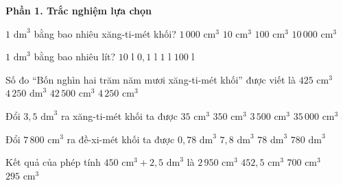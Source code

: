 \textbf{Phần 1. Trắc nghiệm lựa chọn}

\begin{ex} %
$1\text{ dm}^3$ bằng bao nhiêu xăng-ti-mét khối?
\choice
{\True $1\,000\text{ cm}^3$}
{$10\text{ cm}^3$}
{$100\text{ cm}^3$}
{$10\,000\text{ cm}^3$}
\end{ex}

\begin{ex} %
$1\text{ dm}^3$ bằng bao nhiêu lít?
\choice
{$10\text{ l}$}
{$0{,}1\text{ l}$}
{\True $1\text{ l}$}
{$100\text{ l}$}
\end{ex}

\begin{ex} %
Số đo “Bốn nghìn hai trăm năm mươi xăng-ti-mét khối” được viết là
\choice
{$425\text{ cm}^3$}
{$4\,250\text{ dm}^3$}
{$42\,500\text{ cm}^3$}
{\True $4\,250\text{ cm}^3$}
\end{ex}

\begin{ex} %
Đổi $3{,}5\text{ dm}^3$ ra xăng-ti-mét khối ta được
\choice
{$35\text{ cm}^3$}
{$350\text{ cm}^3$}
{\True $3\,500\text{ cm}^3$}
{$35\,000\text{ cm}^3$}
\end{ex}

\begin{ex} %
Đổi $7\,800\text{ cm}^3$ ra đề-xi-mét khối ta được
\choice
{$0{,}78\text{ dm}^3$}
{\True $7{,}8\text{ dm}^3$}
{$78\text{ dm}^3$}
{$780\text{ dm}^3$}
\end{ex}

\begin{ex} %
Kết quả của phép tính $450\text{ cm}^3 + 2{,}5\text{ dm}^3$ là
\choice
{\True $2\,950\text{ cm}^3$}
{$452{,}5\text{ cm}^3$}
{$700\text{ cm}^3$}
{$295\text{ cm}^3$}
\end{ex}

